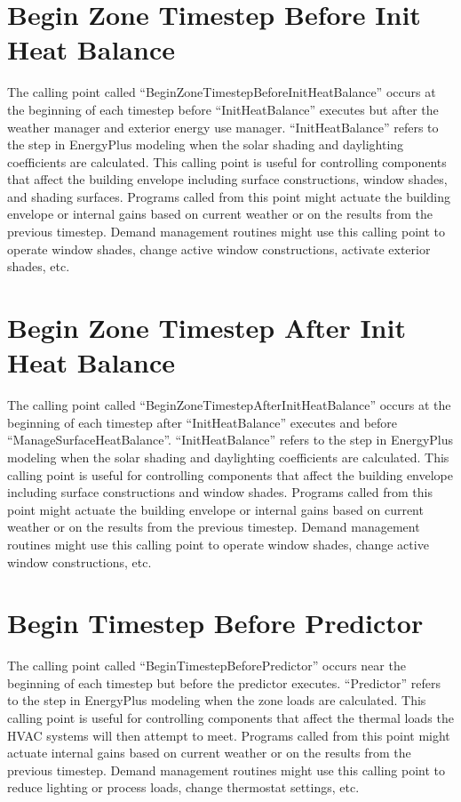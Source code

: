 \section{Begin Zone Timestep Before Init Heat Balance}\label{begin-timestep-before-init-heat-balance}

The calling point called ``BeginZoneTimestepBeforeInitHeatBalance'' occurs at the beginning of each timestep before ``InitHeatBalance'' executes but after the weather manager and exterior energy use manager. ``InitHeatBalance'' refers to the step in EnergyPlus modeling when the solar shading and daylighting coefficients are calculated. This calling point is useful for controlling components that affect the building envelope including surface constructions, window shades, and shading surfaces. Programs called from this point might actuate the building envelope or internal gains based on current weather or on the results from the previous timestep. Demand management routines might use this calling point to operate window shades, change active window constructions, activate exterior shades, etc.

\section{Begin Zone Timestep After Init Heat Balance}\label{begin-timestep-after-init-heat-balance}

The calling point called ``BeginZoneTimestepAfterInitHeatBalance'' occurs at the beginning of each timestep after ``InitHeatBalance'' executes and before ``ManageSurfaceHeatBalance''. ``InitHeatBalance'' refers to the step in EnergyPlus modeling when the solar shading and daylighting coefficients are calculated. This calling point is useful for controlling components that affect the building envelope including surface constructions and window shades. Programs called from this point might actuate the building envelope or internal gains based on current weather or on the results from the previous timestep. Demand management routines might use this calling point to operate window shades, change active window constructions, etc.

\section{Begin Timestep Before Predictor}\label{begin-timestep-before-predictor}

The calling point called ``BeginTimestepBeforePredictor'' occurs near the beginning of each timestep but before the predictor executes. ``Predictor'' refers to the step in EnergyPlus modeling when the zone loads are calculated. This calling point is useful for controlling components that affect the thermal loads the HVAC systems will then attempt to meet. Programs called from this point might actuate internal gains based on current weather or on the results from the previous timestep. Demand management routines might use this calling point to reduce lighting or process loads, change thermostat settings, etc.
